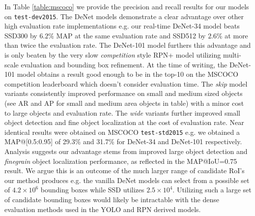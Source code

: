 \documentclass[10pt,twocolumn]{article}
\begin{document}
In Table \ref{table:mscoco} we provide the precision and recall results for our models on \texttt{test-dev2015}. The DeNet models demonstrate a clear advantage over other high evaluation rate implementations e.g. our real-time DeNet-34 model beats SSD300 by $6.2\%$ MAP at the same evaluation rate and SSD512 by $2.6\%$ at more than twice the evaluation rate. The DeNet-101 model furthers this advantage and is only beaten by the very slow \textit{competition} style RPN+ model utilizing multi-scale evaluation and bounding box refinement. At the time of writing, the DeNet-101 model obtains a result good enough to be in the top-10 on the MSCOCO competition leaderboard which doesn't consider evaluation time.
The \textit{skip} model variants consistently improved performance on small and medium sized objects (see AR and AP for small and medium area objects in table)
with a minor cost to large objects and evaluation rate. The \textit{wide} variants further improved small object detection and fine object localization at the cost of evaluation rate. Near identical results were obtained on MSCOCO \texttt{test-std2015} e.g. we obtained a MAP@[0.5:0.95] of 29.3\% and 31.7\% for DeNet-34 and DeNet-101 respectively. Analysis suggests our advantage stems from improved large object detection and \textit{finegrain} object localization performance, as reflected in the MAP@IoU=0.75 result. We argue this is an outcome of the much larger range of candidate RoI's our method produces e.g. the vanilla DeNet models can select from a possible set of $4.2\times 10^6$ bounding boxes while SSD utilizes $2.5\times 10^4$. Utilizing such a large set of candidate bounding boxes would likely be intractable with the dense evaluation methods used in the YOLO and RPN derived models. 
\end{document}
